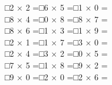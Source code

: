 \documentclass[uplatex,
paper=a4,
fontsize=18pt,
jafontsize=16pt,
number_of_lines=30,
line_length=30zh,
baselineskip=25pt,
]{jlreq}
\begin{document}
□\hspace{1em}2 × 2 =\hspace{3em}□\hspace{1em}6 × 5 =\hspace{3em}□\hspace{1em}1 × 0 =\hspace{3em}
\\

□\hspace{1em}8 × 4 =\hspace{3em}□\hspace{1em}0 × 8 =\hspace{3em}□\hspace{1em}8 × 7 =\hspace{3em}
\\

□\hspace{1em}8 × 6 =\hspace{3em}□\hspace{1em}1 × 3 =\hspace{3em}□\hspace{1em}1 × 9 =\hspace{3em}
\\

□\hspace{1em}2 × 1 =\hspace{3em}□\hspace{1em}1 × 7 =\hspace{3em}□\hspace{1em}3 × 0 =\hspace{3em}
\\

□\hspace{1em}2 × 4 =\hspace{3em}□\hspace{1em}3 × 2 =\hspace{3em}□\hspace{1em}0 × 5 =\hspace{3em}
\\

□\hspace{1em}7 × 5 =\hspace{3em}□\hspace{1em}1 × 8 =\hspace{3em}□\hspace{1em}9 × 2 =\hspace{3em}
\\

□\hspace{1em}9 × 0 =\hspace{3em}□\hspace{1em}2 × 0 =\hspace{3em}□\hspace{1em}2 × 6 =\hspace{3em}
\\
\end{document}
